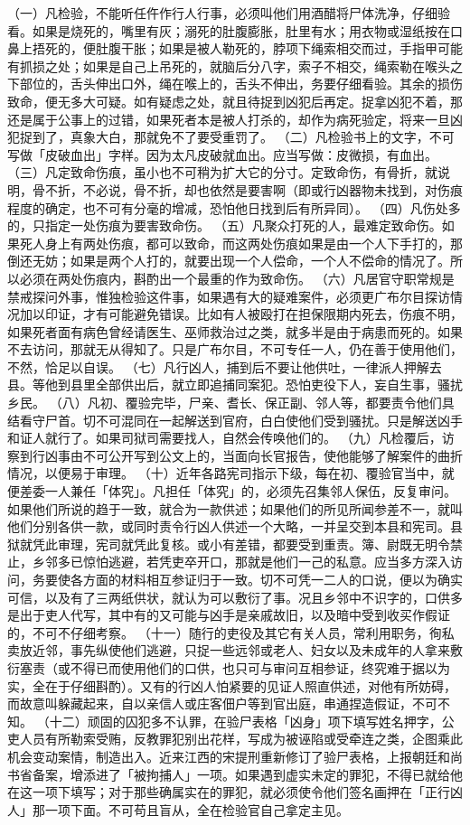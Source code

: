 \documentclass[12pt,UTF8]{ctexbook}
\begin{document}
（一）凡检验，不能听任仵作行人行事，必须叫他们用酒醋将尸体洗净，仔细验看。如果是烧死的，嘴里有灰；溺死的肚腹膨胀，肚里有水；用衣物或湿纸按在口鼻上捂死的，便肚腹干胀；如果是被人勒死的，脖项下绳索相交而过，手指甲可能有抓损之处；如果是自己上吊死的，就脑后分八字，索子不相交，绳索勒在喉头之下部位的，舌头伸出口外，绳在喉上的，舌头不伸出，务要仔细看验。其余的损伤致命，便无多大可疑。如有疑虑之处，就且待捉到凶犯后再定。捉拿凶犯不着，那还是属于公事上的过错，如果死者本是被人打杀的，却作为病死验定，将来一旦凶犯捉到了，真象大白，那就免不了要受重罚了。
（二）凡检验书上的文字，不可写做「皮破血出」字样。因为太凡皮破就血出。应当写做：皮微损，有血出。
（三）凡定致命伤痕，虽小也不可稍为扩大它的分寸。定致命伤，有骨折，就说明，骨不折，不必说，骨不折，却也依然是要害啊（即或行凶器物未找到，对伤痕程度的确定，也不可有分毫的增减，恐怕他日找到后有所异同）。
（四）凡伤处多的，只指定一处伤痕为要害致命伤。
（五）凡聚众打死的人，最难定致命伤。如果死人身上有两处伤痕，都可以致命，而这两处伤痕如果是由一个人下手打的，那倒还无妨；如果是两个人打的，就要出现一个人偿命，一个人不偿命的情况了。所以必须在两处伤痕内，斟酌出一个最重的作为致命伤。
（六）凡居官守职常规是禁戒探问外事，惟独检验这件事，如果遇有大的疑难案件，必须更广布尔目探访情况加以印证，才有可能避免错误。比如有人被殴打在担保限期内死去，伤痕不明，如果死者面有病色曾经请医生、巫师救治过之类，就多半是由于病患而死的。如果不去访问，那就无从得知了。只是广布尔目，不可专任一人，仍在善于使用他们，不然，恰足以自误。
（七）凡行凶人，捕到后不要让他供吐，一律派人押解去县。等他到县里全部供出后，就立即追捕同案犯。恐怕吏役下人，妄自生事，骚扰乡民。
（八）凡初、覆验完毕，尸亲、耆长、保正副、邻人等，都要责令他们具结看守尸首。切不可混同在一起解送到官府，白白使他们受到骚扰。只是解送凶手和证人就行了。如果司狱司需要找人，自然会传唤他们的。
（九）凡检覆后，访察到行凶事由不可公开写到公文上的，当面向长官报告，使他能够了解案件的曲折情况，以便易于审理。
（十）近年各路宪司指示下级，每在初、覆验官当中，就便差委一人兼任「体究」。凡担任「体究」的，必须先召集邻人保伍，反复审问。如果他们所说的趋于一致，就合为一款供述；如果他们的所见所闻参差不一，就叫他们分别各供一款，或同时责令行凶人供述一个大略，一并呈交到本县和宪司。县狱就凭此审理，宪司就凭此复核。或小有差错，都要受到重责。簿、尉既无明令禁止，乡邻多已惊怕逃避，若凭吏卒开口，那就是他们一己的私意。应当多方深入访问，务要使各方面的材料相互参证归于一致。切不可凭一二人的口说，便以为确实可信，以及有了三两纸供状，就认为可以敷衍了事。况且乡邻中不识字的，口供多是出于吏人代写，其中有的又可能与凶手是亲戚故旧，以及暗中受到收买作假证的，不可不仔细考察。
（十一）随行的吏役及其它有关人员，常利用职务，徇私卖放近邻，事先纵使他们逃避，只捉一些远邻或老人、妇女以及未成年的人拿来敷衍塞责（或不得已而使用他们的口供，也只可与审问互相参证，终究难于据以为实，全在于仔细斟酌）。又有的行凶人怕紧要的见证人照直供述，对他有所妨碍，而故意叫躲藏起来，自以亲信人或庄客佃户等到官出庭，串通捏造假证，不可不知。
（十二）顽固的囚犯多不认罪，在验尸表格「凶身」项下填写姓名押字，公吏人员有所勒索受贿，反教罪犯别出花样，写成为被诬陷或受牵连之类，企图乘此机会变动案情，制造出入。近来江西的宋提刑重新修订了验尸表格，上报朝廷和尚书省备案，增添进了「被拘捕人」一项。如果遇到虚实未定的罪犯，不得已就给他在这一项下填写；对于那些确属实在的罪犯，就必须使令他们签名画押在「正行凶人」那一项下面。不可苟且盲从，全在检验官自己拿定主见。
\end{document}
